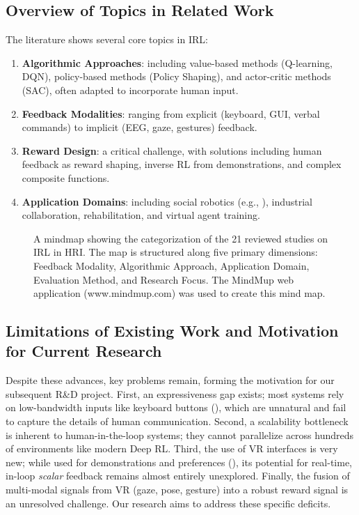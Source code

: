 \documentclass[rnd]{mas_proposal}
\begin{document}
\subsection{Overview of Topics in Related Work}
The literature shows several core topics in IRL:
\begin{enumerate}
    \item \textbf{Algorithmic Approaches}: including value-based methods (Q-learning, DQN), policy-based methods (Policy Shaping), and actor-critic methods (SAC), often adapted to incorporate human input.
    \item \textbf{Feedback Modalities}: ranging from explicit (keyboard, GUI, verbal commands) to implicit (EEG, gaze, gestures) feedback.
    \item \textbf{Reward Design}: a critical challenge, with solutions including human feedback as reward shaping, inverse RL from demonstrations, and complex composite functions. 
    \item \textbf{Application Domains}: including social robotics (e.g., \citet{Akalin2021}), industrial collaboration, rehabilitation, and virtual agent training.
\end{enumerate}

\begin{figure}[h!]
\centering

\caption{A mindmap showing the categorization of the 21 reviewed studies on IRL in HRI. The map is structured along five primary dimensions: Feedback Modality, Algorithmic Approach, Application Domain, Evaluation Method, and Research Focus. The MindMup web application (www.mindmup.com) was used to create this mind map.}
\label{fig:alg_dist}
\end{figure}

\subsection{Limitations of Existing Work and Motivation for Current Research}
Despite these advances, key problems remain, forming the motivation for our subsequent R\&D project. First, an expressiveness gap exists; most systems rely on low-bandwidth inputs like keyboard buttons (\citet{Faulkner2020, Loftin2014}), which are unnatural and fail to capture the details of human communication. Second, a scalability bottleneck is inherent to human-in-the-loop systems; they cannot parallelize across hundreds of environments like modern Deep RL. Third, the use of VR interfaces is very new; while used for demonstrations and preferences (\citet{Heuvel2025}), its potential for real-time, in-loop \textit{scalar} feedback remains almost entirely unexplored. Finally, the fusion of multi-modal signals from VR (gaze, pose, gesture) into a robust reward signal is an unresolved challenge. Our research aims to address these specific deficits.
\end{document}
